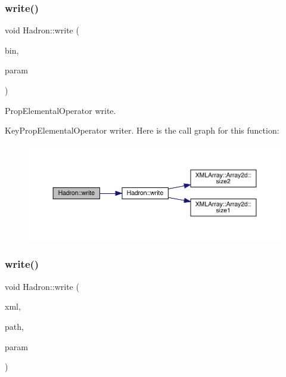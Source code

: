 \subsubsection{\texorpdfstring{write()}{write()}\hspace{0.1cm}{\footnotesize\ttfamily [23/95]}}
{\footnotesize\ttfamily void Hadron\+::write (\begin{DoxyParamCaption}\item[{\mbox{\hyperlink{classADATIO_1_1BinaryWriter}{Binary\+Writer}} \&}]{bin,  }\item[{const \mbox{\hyperlink{structHadron_1_1KeyPropElementalOperator__t}{Key\+Prop\+Elemental\+Operator\+\_\+t}} \&}]{param }\end{DoxyParamCaption})}



Prop\+Elemental\+Operator write. 

Key\+Prop\+Elemental\+Operator writer. Here is the call graph for this function\+:
\nopagebreak
\begin{figure}[H]
\begin{center}
\leavevmode
\includegraphics[width=350pt]{d1/daf/namespaceHadron_a2d77dd144d88ef6a060cca397fb32373_cgraph}
\end{center}
\end{figure}
\mbox{\label{namespaceHadron_ac358b1203bd94f6b26452402911ce174}} 
\subsubsection{\texorpdfstring{write()}{write()}\hspace{0.1cm}{\footnotesize\ttfamily [24/95]}}
{\footnotesize\ttfamily void Hadron\+::write (\begin{DoxyParamCaption}\item[{\mbox{\hyperlink{classADATXML_1_1XMLWriter}{X\+M\+L\+Writer}} \&}]{xml,  }\item[{const std\+::string \&}]{path,  }\item[{const \mbox{\hyperlink{structHadron_1_1KeyBaryonElementalOperator__t}{Key\+Baryon\+Elemental\+Operator\+\_\+t}} \&}]{param }\end{DoxyParamCaption})}




